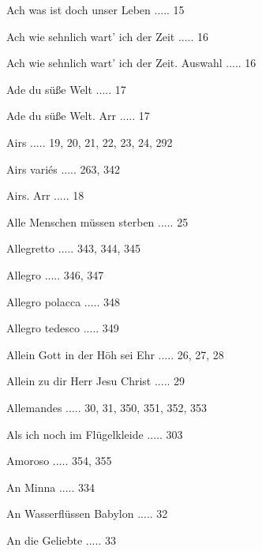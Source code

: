 \documentclass[twocolumn]{book}
\begin{document}
\newline 
Ach was ist doch unser Leben ..... 15

\newline 
Ach wie sehnlich wart' ich der Zeit ..... 16

\newline 
Ach wie sehnlich wart' ich der Zeit. Auswahl ..... 16

\newline 
Ade du süße Welt ..... 17

\newline 
Ade du süße Welt. Arr ..... 17

\newline 
Airs ..... 19, 20, 21, 22, 23, 24, 292

\newline 
Airs variés ..... 263, 342

\newline 
Airs. Arr ..... 18

\newline 
Alle Menschen müssen sterben ..... 25

\newline 
Allegretto ..... 343, 344, 345

\newline 
Allegro ..... 346, 347

\newline 
Allegro polacca ..... 348

\newline 
Allegro tedesco ..... 349

\newline 
Allein Gott in der Höh sei Ehr ..... 26, 27, 28

\newline 
Allein zu dir Herr Jesu Christ ..... 29

\newline 
Allemandes ..... 30, 31, 350, 351, 352, 353

\newline 
Als ich noch im Flügelkleide ..... 303

\newline 
Amoroso ..... 354, 355

\newline 
An Minna ..... 334

\newline 
An Wasserflüssen Babylon ..... 32

\newline 
An die Geliebte ..... 33
\end{document}
